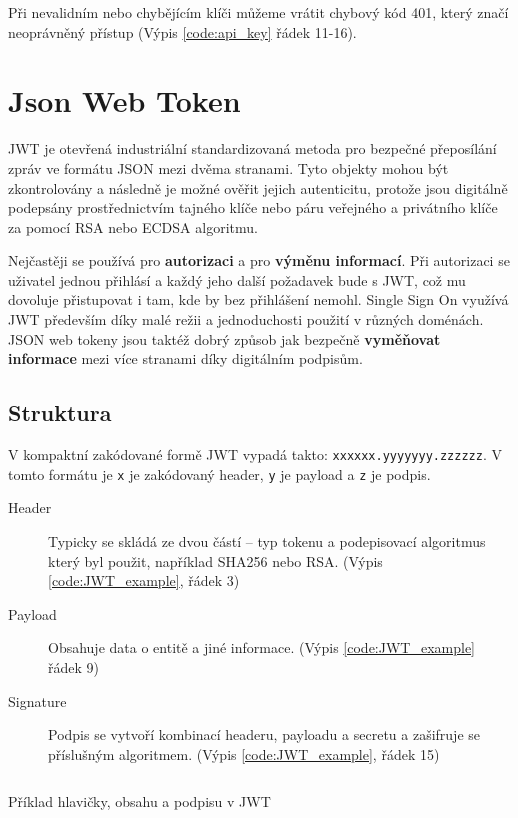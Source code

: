 Při nevalidním nebo chybějícím klíči můžeme vrátit chybový kód 401, který značí neoprávněný přístup (Výpis \ref{code:api_key} řádek 11-16).


\section{Json Web Token} %
\label{sec:jwt}
JWT je otevřená industriální standardizovaná %
metoda pro bezpečné přeposílání zpráv ve formátu JSON mezi dvěma stranami. Tyto objekty mohou být zkontrolovány a následně je možné ověřit jejich autenticitu, protože jsou digitálně podepsány prostřednictvím tajného klíče nebo páru veřejného a privátního klíče za pomocí RSA nebo ECDSA algoritmu.

Nejčastěji se používá pro \textbf{autorizaci} a pro \textbf{výměnu informací}. Při autorizaci se uživatel jednou přihlásí a každý jeho další požadavek bude s JWT, což mu dovoluje přistupovat i tam, kde by bez přihlášení nemohl. Single Sign On %
využívá JWT především díky malé režii a jednoduchosti použití v různých doménách. JSON web tokeny jsou taktéž dobrý způsob jak bezpečně \textbf{vyměňovat informace} mezi více stranami díky digitálním podpisům.

\subsection{Struktura}
V kompaktní zakódované formě JWT vypadá takto: \texttt{xxxxxx.yyyyyyy.zzzzzz}. V tomto formátu je \texttt{x} je zakódovaný header, \texttt{y} je payload a \texttt{z} je podpis.

\begin{description}
    \item[Header] Typicky se skládá ze dvou částí -- typ tokenu a podepisovací algoritmus který byl použit, například SHA256 nebo RSA. (Výpis \ref{code:JWT_example}, řádek 3)
    \item[Payload] Obsahuje data o entitě a jiné informace. (Výpis \ref{code:JWT_example} řádek 9)
    \item[Signature] Podpis se vytvoří kombinací headeru, payloadu a secretu a zašifruje se příslušným algoritmem. (Výpis \ref{code:JWT_example}, řádek 15)
\end{description}

\begin{listing}[ht!]
    \inputminted[]{json}{resources/code/security/JWT.jsonc}
    \caption{Příklad hlavičky, obsahu a podpisu v JWT} %
    \label{code:JWT_example}
\end{listing}


